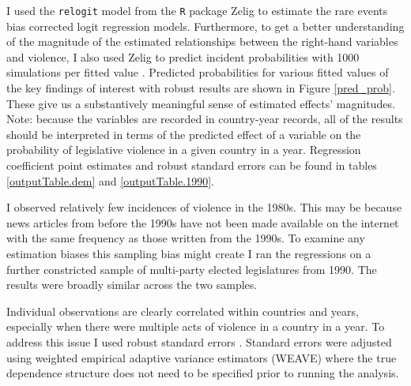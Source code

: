 \documentclass[a4paper]{article}\usepackage[]{graphicx}\usepackage[]{color}
\begin{document}
I used the {\tt{relogit}} model from the {\tt{R}} package Zelig \citep{IMAIKingZelig2008} to estimate the rare events bias corrected logit regression models. Furthermore, to get a better understanding of the magnitude of the estimated relationships between the right-hand variables and violence, I also used Zelig to predict incident probabilities with 1000 simulations per fitted value \citep[see][]{King2002}. Predicted probabilities for various fitted values of the key findings of interest with robust results are shown in Figure \ref{pred_prob}. These give us a substantively meaningful sense of estimated effects' magnitudes. Note: because the variables are recorded in country-year records, all of the results should be interpreted in terms of the predicted effect of a variable on the probability of legislative violence in a given country in a year. Regression coefficient point estimates and robust standard errors can be found in tables \ref{outputTable.dem} and \ref{outputTable.1990}.

I observed relatively few incidences of violence in the 1980s. This may be because news articles from before the 1990s have not been made available on the internet with the same frequency as those written from the 1990s. To examine any estimation biases this sampling bias might create I ran the regressions on a further constricted sample of multi-party elected legislatures from 1990. The results were broadly similar across the two samples. 

Individual observations are clearly correlated within countries and years, especially when there were multiple acts of violence in a country in a year. To address this issue I used robust standard errors \citep{Golder2006, Mainwaring2007}. Standard errors were adjusted using \cite{Lumley1999} weighted empirical adaptive variance estimators (WEAVE) where the true dependence structure does not need to be specified prior to running the analysis. 
\end{document}
